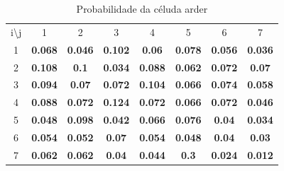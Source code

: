 \documentclass[11pt]{article} %
\begin{document}
\begin{table}[h]
\centering
\begin{tabular}{cccccccc}
i\textbackslash{}j     & 1                                   & 2                                   & 3                                   & 4                                   & 5                                   & 6                                   & 7                                   \\ \cline{2-8}
\multicolumn{1}{c|}{1} & \multicolumn{1}{c|}{\textbf{0.068}} & \multicolumn{1}{c|}{\textbf{0.046}} & \multicolumn{1}{c|}{\textbf{0.102}} & \multicolumn{1}{c|}{\textbf{0.06}}  & \multicolumn{1}{c|}{\textbf{0.078}} & \multicolumn{1}{c|}{\textbf{0.056}} & \multicolumn{1}{c|}{\textbf{0.036}} \\ \cline{2-8}
\multicolumn{1}{c|}{2} & \multicolumn{1}{c|}{\textbf{0.108}} & \multicolumn{1}{c|}{\textbf{0.1}}   & \multicolumn{1}{c|}{\textbf{0.034}} & \multicolumn{1}{c|}{\textbf{0.088}} & \multicolumn{1}{c|}{\textbf{0.062}} & \multicolumn{1}{c|}{\textbf{0.072}} & \multicolumn{1}{c|}{\textbf{0.07}}  \\ \cline{2-8}
\multicolumn{1}{c|}{3} & \multicolumn{1}{c|}{\textbf{0.094}} & \multicolumn{1}{c|}{\textbf{0.07}}  & \multicolumn{1}{c|}{\textbf{0.072}} & \multicolumn{1}{c|}{\textbf{0.104}} & \multicolumn{1}{c|}{\textbf{0.066}} & \multicolumn{1}{c|}{\textbf{0.074}} & \multicolumn{1}{c|}{\textbf{0.058}} \\ \cline{2-8}
\multicolumn{1}{c|}{4} & \multicolumn{1}{c|}{\textbf{0.088}} & \multicolumn{1}{c|}{\textbf{0.072}} & \multicolumn{1}{c|}{\textbf{0.124}} & \multicolumn{1}{c|}{\textbf{0.072}} & \multicolumn{1}{c|}{\textbf{0.066}} & \multicolumn{1}{c|}{\textbf{0.072}} & \multicolumn{1}{c|}{\textbf{0.046}} \\ \cline{2-8}
\multicolumn{1}{c|}{5} & \multicolumn{1}{c|}{\textbf{0.048}} & \multicolumn{1}{c|}{\textbf{0.098}} & \multicolumn{1}{c|}{\textbf{0.042}} & \multicolumn{1}{c|}{\textbf{0.066}} & \multicolumn{1}{c|}{\textbf{0.076}} & \multicolumn{1}{c|}{\textbf{0.04}}  & \multicolumn{1}{c|}{\textbf{0.034}} \\ \cline{2-8}
\multicolumn{1}{c|}{6} & \multicolumn{1}{c|}{\textbf{0.054}} & \multicolumn{1}{c|}{\textbf{0.052}} & \multicolumn{1}{c|}{\textbf{0.07}}  & \multicolumn{1}{c|}{\textbf{0.054}} & \multicolumn{1}{c|}{\textbf{0.048}} & \multicolumn{1}{c|}{\textbf{0.04}}  & \multicolumn{1}{c|}{\textbf{0.03}}  \\ \cline{2-8}
\multicolumn{1}{c|}{7} & \multicolumn{1}{c|}{\textbf{0.062}} & \multicolumn{1}{c|}{\textbf{0.062}} & \multicolumn{1}{c|}{\textbf{0.04}}  & \multicolumn{1}{c|}{\textbf{0.044}} & \multicolumn{1}{c|}{\textbf{0.3}}   & \multicolumn{1}{c|}{\textbf{0.024}} & \multicolumn{1}{c|}{\textbf{0.012}} \\ \cline{2-8}
\end{tabular}
\caption{Probabilidade da céluda arder}
\end{table}
\end{document}
